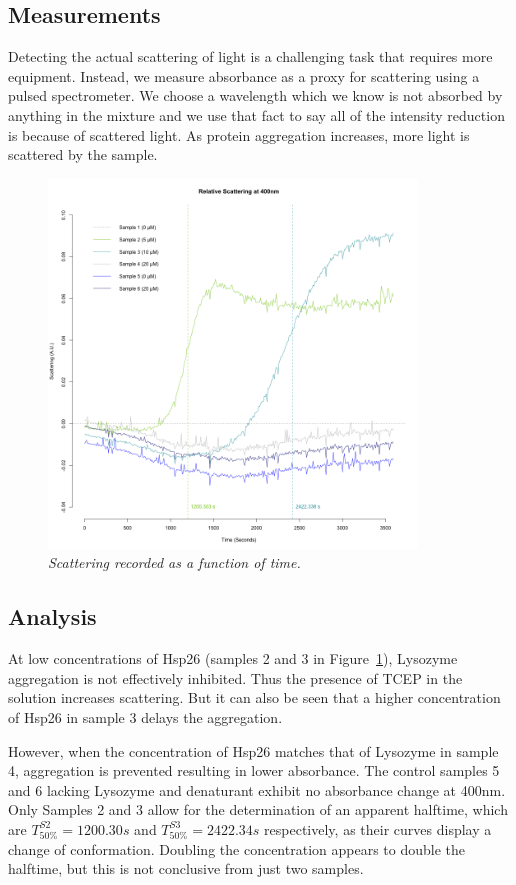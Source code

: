 \documentclass[a4paper,10pt]{article}
\begin{document}
        \subsection*{Measurements}
            Detecting the actual scattering of light is a challenging task that requires more equipment.
            Instead, we measure absorbance as a proxy for scattering using a pulsed spectrometer.
            We choose a wavelength which we know is not absorbed by anything in the mixture and 
            we use that fact to say all of the intensity reduction is because of scattered light.
            As protein aggregation increases, more light is scattered by the sample. 
            \begin{figure}[H]
                \centering
                \includegraphics[width=370px]{../resources/aggregation_main.png}
                \caption{\it Scattering recorded as a function of time.}\label{fig:agg_main}
            \end{figure}

        \subsection*{Analysis}
            At low concentrations of Hsp26 (samples 2 and 3 in Figure~\ref{fig:agg_main}), 
            Lysozyme aggregation is not effectively inhibited. 
            Thus the presence of TCEP in the solution increases scattering. 
            But it can also be seen that a higher concentration of Hsp26 in sample 3 delays the aggregation.
            
            However, when the concentration of Hsp26 matches that of Lysozyme in sample 4, 
            aggregation is prevented resulting in lower absorbance.
            The control samples 5 and 6 lacking Lysozyme and denaturant exhibit no absorbance change at 400nm. 
            Only Samples 2 and 3 allow for the determination of an apparent halftime, which are $T^{S2}_{50\%} = 1200.30s$
            and $T^{S3}_{50\%} = 2422.34s$ respectively, as their curves display a change of conformation.
            Doubling the concentration appears to double the halftime, but this is not conclusive from just two samples.
    \pagebreak
    
\end{document}
